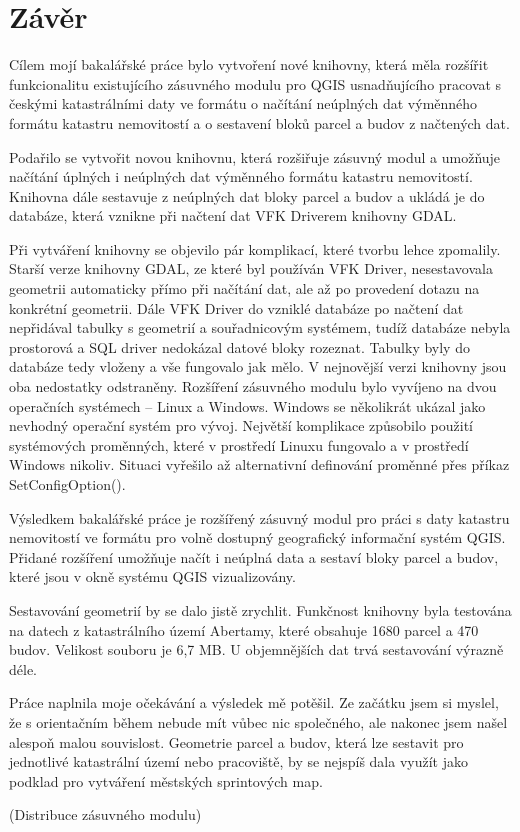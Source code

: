 \chapter{Závěr}
\label{5-zaver}
Cílem mojí bakalářské práce bylo vytvoření nové knihovny, která měla rozšířit funkcionalitu existujícího zásuvného modulu pro QGIS usnadňujícího pracovat s českými katastrálními daty ve formátu  o načítání neúplných dat výměnného formátu katastru nemovitostí a o sestavení bloků parcel a budov z načtených dat.

Podařilo se vytvořit novou knihovnu, která rozšiřuje zásuvný modul a umožňuje načítání úplných i neúplných dat výměnného formátu katastru nemovitostí. Knihovna dále sestavuje z neúplných dat bloky parcel a budov a ukládá je do databáze, která vznikne při načtení dat VFK Driverem knihovny GDAL.

Při vytváření knihovny se objevilo pár komplikací, které tvorbu lehce zpomalily. Starší verze knihovny GDAL, ze které byl používán VFK Driver, nesestavovala geometrii automaticky přímo při načítání dat, ale až po provedení dotazu na konkrétní geometrii. Dále VFK Driver do vzniklé databáze po načtení dat nepřidával tabulky s geometrií a souřadnicovým systémem, tudíž databáze nebyla prostorová a SQL driver nedokázal datové bloky rozeznat. Tabulky byly do databáze tedy vloženy a vše fungovalo jak mělo. V nejnovější verzi knihovny jsou oba nedostatky odstraněny. Rozšíření zásuvného modulu bylo vyvíjeno na dvou operačních systémech -- Linux a Windows. Windows se několikrát ukázal jako nevhodný operační systém pro vývoj. Největší komplikace způsobilo použití systémových proměnných, které v prostředí Linuxu fungovalo a v prostředí Windows nikoliv. Situaci vyřešilo až alternativní definování proměnné přes příkaz SetConfigOption().

Výsledkem bakalářské práce je rozšířený zásuvný modul pro práci s daty katastru nemovitostí ve formátu  pro volně dostupný geografický informační systém QGIS. Přidané rozšíření umožňuje načít i neúplná data a sestaví bloky parcel a budov, které jsou v okně systému QGIS vizualizovány.

Sestavování geometrií by se dalo jistě zrychlit. Funkčnost knihovny byla testována na datech z katastrálního území Abertamy, které obsahuje 1680 parcel a 470 budov. Velikost  souboru je 6,7 MB. U objemnějších dat trvá sestavování výrazně déle.

Práce naplnila moje očekávání a výsledek mě potěšil. Ze začátku jsem si myslel, že s orientačním během nebude mít vůbec nic společného, ale nakonec jsem našel alespoň malou souvislost. Geometrie parcel a budov, která lze sestavit pro jednotlivé katastrální území nebo pracoviště, by se nejspíš dala využít jako podklad pro vytváření městských sprintových map.

(Distribuce zásuvného modulu)
